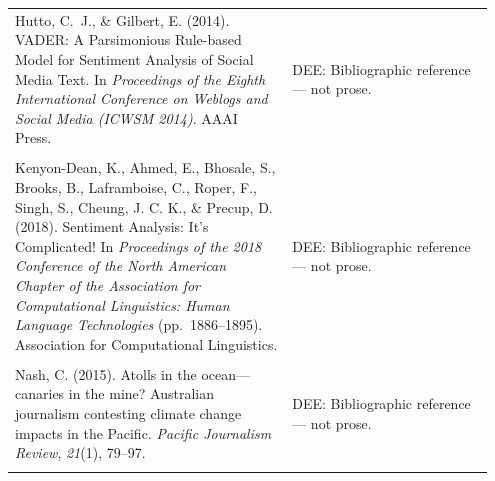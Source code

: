 \documentclass[11pt]{article}
\begin{document}
\begin{longtable}{|p{0.55\linewidth}|p{0.40\linewidth}|}
\hline
\rule{0pt}{3.5cm} & \\
\hline
Hutto, C.~J., \& Gilbert, E. (2014). VADER: A Parsimonious Rule-based Model for Sentiment Analysis of Social Media Text. In \textit{Proceedings of the Eighth International Conference on Weblogs and Social Media (ICWSM 2014)}. AAAI Press. & DEE: Bibliographic reference --- not prose. \\[2pt]
\hline
\rule{0pt}{3.5cm} & \\
\hline
Kenyon-Dean, K., Ahmed, E., Bhosale, S., Brooks, B., Laframboise, C., Roper, F., Singh, S., Cheung, J. C. K., \& Precup, D. (2018). Sentiment Analysis: It's Complicated! In \textit{Proceedings of the 2018 Conference of the North American Chapter of the Association for Computational Linguistics: Human Language Technologies} (pp.\ 1886--1895). Association for Computational Linguistics. & DEE: Bibliographic reference --- not prose. \\[2pt]
\hline
\rule{0pt}{3.5cm} & \\
\hline
Nash, C. (2015). Atolls in the ocean---canaries in the mine? Australian journalism contesting climate change impacts in the Pacific. \textit{Pacific Journalism Review}, \textit{21}(1), 79--97. & DEE: Bibliographic reference --- not prose. \\[2pt]
\hline
\rule{0pt}{3.5cm} & \\
\hline
\end{longtable}
\end{document}
